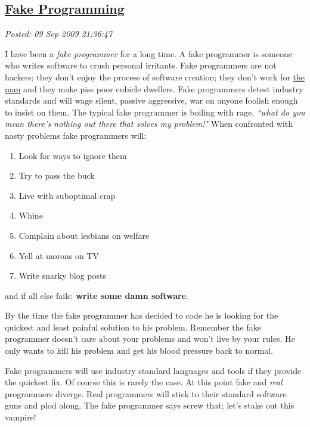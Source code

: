 %

\subsection*{\href{https://bakerjd99.wordpress.com/2009/09/09/fake-progamming/}{Fake Programming}}


\noindent\emph{Posted: 09 Sep 2009 21:36:47}
\vspace{6pt}

I have been a \emph{fake programmer} for a long time. A fake programmer
is someone who writes software to crush personal irritants. Fake
programmers are not hackers; they don't enjoy the process of software
creation; they don't work for
\href{http://en.wikipedia.org/wiki/The\_Man} {the man} and they make piss
poor cubicle dwellers. Fake programmers detest industry standards and
will wage silent, passive aggressive, war on anyone foolish enough to
insist on them. The typical fake programmer is boiling with rage,
\emph{``what do you mean there's nothing out there that solves my
problem!"} When confronted with nasty problems fake programmers will:

\begin{enumerate}
\tightlist
\item
  Look for ways to ignore them
\item
  Try to pass the buck
\item
  Live with suboptimal crap
\item
  Whine
\item
  Complain about lesbians on welfare
\item
  Yell at morons on TV
\item
  Write snarky blog posts
\end{enumerate}
and if all else fails: \textbf{write some damn software}.

By the time the fake programmer has decided to code he is looking for
the quickest and least painful solution to his problem. Remember the
fake programmer doesn't care about your problems and won't live by your
rules. He only wants to kill his problem and get his blood pressure back
to normal.

Fake programmers will use industry standard languages and tools if they
provide the quickest fix. Of course this is rarely the case. At this
point fake and \emph{real} programmers diverge. Real programmers will
stick to their standard software guns and plod along. The fake
programmer says screw that; let's stake out this vampire!

